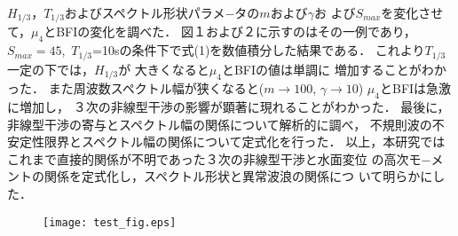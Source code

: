 \documentclass[11pt,dvipdfmx]{jarticle}
\begin{document}
$H_{1/3}$，$T_{1/3}$およびスペクトル形状パラメ−タの$m$および$\gamma$お
よび$S_{max}$を変化させて，$\mu_4$とBFIの変化を調べた．
図１および２に示すのはその一例であり，$S_{max}=45$,\ $T_{1/3}$=10sの条件下で式(1)を数値積分した結果である．
これより$T_{1/3}$一定の下では，$H_{1/3}$が
大きくなると$\mu_4$とBFIの値は単調に
増加することがわかった．
また周波数スペクトル幅が狭くなると($m\rightarrow100$, $\gamma\rightarrow10$)
$\mu_4$とBFIは急激に増加し，
３次の非線型干渉の影響が顕著に現れることがわかった．
最後に，非線型干渉の寄与とスペクトル幅の関係について解析的に調べ，
不規則波の不安定性限界とスペクトル幅の関係について定式化を行った．
以上，本研究では
これまで直接的関係が不明であった３次の非線型干渉と水面変位
の高次モ−メントの関係を定式化し，スペクトル形状と異常波浪の関係につ
いて明らかにした．

\begin{figure}
\texttt{[image: test\_fig.eps]}
\end{figure}
\end{document}

